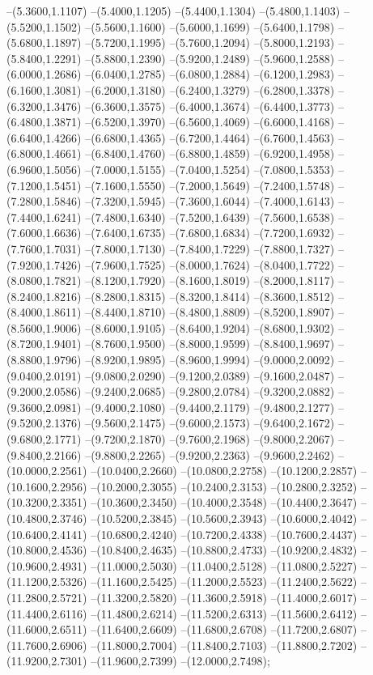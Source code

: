 {	--(5.3600,1.1107)
	--(5.4000,1.1205)
	--(5.4400,1.1304)
	--(5.4800,1.1403)
	--(5.5200,1.1502)
	--(5.5600,1.1600)
	--(5.6000,1.1699)
	--(5.6400,1.1798)
	--(5.6800,1.1897)
	--(5.7200,1.1995)
	--(5.7600,1.2094)
	--(5.8000,1.2193)
	--(5.8400,1.2291)
	--(5.8800,1.2390)
	--(5.9200,1.2489)
	--(5.9600,1.2588)
	--(6.0000,1.2686)
	--(6.0400,1.2785)
	--(6.0800,1.2884)
	--(6.1200,1.2983)
	--(6.1600,1.3081)
	--(6.2000,1.3180)
	--(6.2400,1.3279)
	--(6.2800,1.3378)
	--(6.3200,1.3476)
	--(6.3600,1.3575)
	--(6.4000,1.3674)
	--(6.4400,1.3773)
	--(6.4800,1.3871)
	--(6.5200,1.3970)
	--(6.5600,1.4069)
	--(6.6000,1.4168)
	--(6.6400,1.4266)
	--(6.6800,1.4365)
	--(6.7200,1.4464)
	--(6.7600,1.4563)
	--(6.8000,1.4661)
	--(6.8400,1.4760)
	--(6.8800,1.4859)
	--(6.9200,1.4958)
	--(6.9600,1.5056)
	--(7.0000,1.5155)
	--(7.0400,1.5254)
	--(7.0800,1.5353)
	--(7.1200,1.5451)
	--(7.1600,1.5550)
	--(7.2000,1.5649)
	--(7.2400,1.5748)
	--(7.2800,1.5846)
	--(7.3200,1.5945)
	--(7.3600,1.6044)
	--(7.4000,1.6143)
	--(7.4400,1.6241)
	--(7.4800,1.6340)
	--(7.5200,1.6439)
	--(7.5600,1.6538)
	--(7.6000,1.6636)
	--(7.6400,1.6735)
	--(7.6800,1.6834)
	--(7.7200,1.6932)
	--(7.7600,1.7031)
	--(7.8000,1.7130)
	--(7.8400,1.7229)
	--(7.8800,1.7327)
	--(7.9200,1.7426)
	--(7.9600,1.7525)
	--(8.0000,1.7624)
	--(8.0400,1.7722)
	--(8.0800,1.7821)
	--(8.1200,1.7920)
	--(8.1600,1.8019)
	--(8.2000,1.8117)
	--(8.2400,1.8216)
	--(8.2800,1.8315)
	--(8.3200,1.8414)
	--(8.3600,1.8512)
	--(8.4000,1.8611)
	--(8.4400,1.8710)
	--(8.4800,1.8809)
	--(8.5200,1.8907)
	--(8.5600,1.9006)
	--(8.6000,1.9105)
	--(8.6400,1.9204)
	--(8.6800,1.9302)
	--(8.7200,1.9401)
	--(8.7600,1.9500)
	--(8.8000,1.9599)
	--(8.8400,1.9697)
	--(8.8800,1.9796)
	--(8.9200,1.9895)
	--(8.9600,1.9994)
	--(9.0000,2.0092)
	--(9.0400,2.0191)
	--(9.0800,2.0290)
	--(9.1200,2.0389)
	--(9.1600,2.0487)
	--(9.2000,2.0586)
	--(9.2400,2.0685)
	--(9.2800,2.0784)
	--(9.3200,2.0882)
	--(9.3600,2.0981)
	--(9.4000,2.1080)
	--(9.4400,2.1179)
	--(9.4800,2.1277)
	--(9.5200,2.1376)
	--(9.5600,2.1475)
	--(9.6000,2.1573)
	--(9.6400,2.1672)
	--(9.6800,2.1771)
	--(9.7200,2.1870)
	--(9.7600,2.1968)
	--(9.8000,2.2067)
	--(9.8400,2.2166)
	--(9.8800,2.2265)
	--(9.9200,2.2363)
	--(9.9600,2.2462)
	--(10.0000,2.2561)
	--(10.0400,2.2660)
	--(10.0800,2.2758)
	--(10.1200,2.2857)
	--(10.1600,2.2956)
	--(10.2000,2.3055)
	--(10.2400,2.3153)
	--(10.2800,2.3252)
	--(10.3200,2.3351)
	--(10.3600,2.3450)
	--(10.4000,2.3548)
	--(10.4400,2.3647)
	--(10.4800,2.3746)
	--(10.5200,2.3845)
	--(10.5600,2.3943)
	--(10.6000,2.4042)
	--(10.6400,2.4141)
	--(10.6800,2.4240)
	--(10.7200,2.4338)
	--(10.7600,2.4437)
	--(10.8000,2.4536)
	--(10.8400,2.4635)
	--(10.8800,2.4733)
	--(10.9200,2.4832)
	--(10.9600,2.4931)
	--(11.0000,2.5030)
	--(11.0400,2.5128)
	--(11.0800,2.5227)
	--(11.1200,2.5326)
	--(11.1600,2.5425)
	--(11.2000,2.5523)
	--(11.2400,2.5622)
	--(11.2800,2.5721)
	--(11.3200,2.5820)
	--(11.3600,2.5918)
	--(11.4000,2.6017)
	--(11.4400,2.6116)
	--(11.4800,2.6214)
	--(11.5200,2.6313)
	--(11.5600,2.6412)
	--(11.6000,2.6511)
	--(11.6400,2.6609)
	--(11.6800,2.6708)
	--(11.7200,2.6807)
	--(11.7600,2.6906)
	--(11.8000,2.7004)
	--(11.8400,2.7103)
	--(11.8800,2.7202)
	--(11.9200,2.7301)
	--(11.9600,2.7399)
	--(12.0000,2.7498);
}
